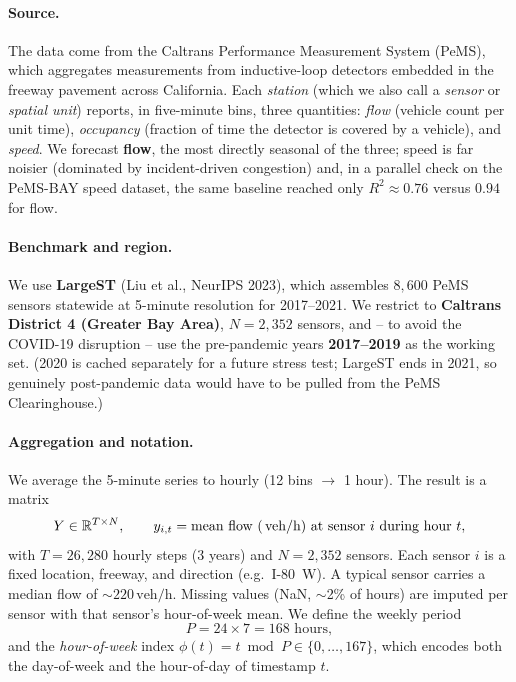 \documentclass[11pt]{article}
\newcommand{\veh}{\,\text{veh/h}}
\begin{document}
\paragraph{Source.} The data come from the Caltrans Performance Measurement
System (PeMS), which aggregates measurements from inductive-loop detectors
embedded in the freeway pavement across California. Each \emph{station} (which we
also call a \emph{sensor} or \emph{spatial unit}) reports, in five-minute bins,
three quantities: \emph{flow} (vehicle count per unit time), \emph{occupancy}
(fraction of time the detector is covered by a vehicle), and \emph{speed}. We
forecast \textbf{flow}, the most directly seasonal of the three; speed is far
noisier (dominated by incident-driven congestion) and, in a parallel check on
the PeMS-BAY speed dataset, the same baseline reached only $R^2\approx0.76$
versus $0.94$ for flow.

\paragraph{Benchmark and region.} We use \textbf{LargeST} (Liu et al., NeurIPS
2023), which assembles $8{,}600$ PeMS sensors statewide at 5-minute resolution
for 2017--2021. We restrict to \textbf{Caltrans District 4 (Greater Bay Area)},
$N=2{,}352$ sensors, and -- to avoid the COVID-19 disruption -- use the
pre-pandemic years \textbf{2017--2019} as the working set. (2020 is cached
separately for a future stress test; LargeST ends in 2021, so genuinely
post-pandemic data would have to be pulled from the PeMS Clearinghouse.)

\paragraph{Aggregation and notation.} We average the 5-minute series to hourly
(12 bins $\to$ 1 hour). The result is a matrix
\[
Y \in \mathbb{R}^{T\times N},\qquad
y_{i,t} = \text{mean flow (\veh) at sensor } i \text{ during hour } t,
\]
with $T = 26{,}280$ hourly steps ($3$ years) and $N=2{,}352$ sensors. Each
sensor $i$ is a fixed location, freeway, and direction (e.g.\ I-80~W). A
typical sensor carries a median flow of $\sim$$220\veh$. Missing values
(NaN, $\sim$2\% of hours) are imputed per sensor with that sensor's hour-of-week
mean. We define the weekly period
\[
P = 24\times 7 = 168 \text{ hours},
\]
and the \emph{hour-of-week} index $\phi(t)=t \bmod P \in\{0,\dots,167\}$, which
encodes both the day-of-week and the hour-of-day of timestamp $t$.
\end{document}
